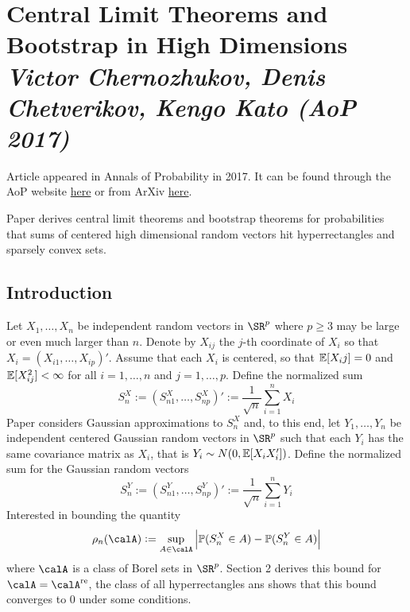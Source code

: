 
\section{Central Limit Theorems and Bootstrap in High Dimensions \textit{\small Victor Chernozhukov, Denis Chetverikov, Kengo Kato (AoP 2017)}}

Article appeared in Annals of Probability in 2017. It can be found through the AoP website \href{https://projecteuclid.org/euclid.aop/1502438428}{here} or from ArXiv \href{https://arxiv.org/pdf/1412.3661.pdf}{here}.

Paper derives central limit theorems and bootstrap theorems for probabilities that sums of centered high dimensional random vectors hit hyperrectangles and sparsely convex sets. 

\subsection{Introduction}

Let $X_1, \dots, X_n$ be independent random vectors in $\SR^p$ where $p\geq 3$ may be large or even much larger than $n$. Denote by $X_{ij}$ the $j$-th coordinate of $X_i$ so that $X_i = (X_{i1},\dots,X_{ip})'$. Assume that each $X_i$ is centered, so that $\mathbb{E}[X_ij] = 0$ and $\mathbb{E}[X_{ij}^2] < \infty$ for all $i = 1, \dots, n$ and $j = 1, \dots, p$. Define the normalized sum 
\[S_n^X := \left(S_{n1}^X, \dots, S_{np}^X\right)' := \frac{1}{\sqrt{n}} \sum_{i=1}^n X_i\]
Paper considers Gaussian approximations to $S_n^X$ and, to this end, let $Y_1, \dots, Y_n$ be independent centered Gaussian random vectors in $\SR^p$ such that each $Y_i$ has the same covariance matrix as $X_i$, that is $Y_i \sim N(0,\mathbb{E}[X_iX_i'])$. Define the normalized sum for the Gaussian random vectors 
\[S_n^Y := \left(S_{n1}^Y, \dots, S_{np}^Y\right)' := \frac{1}{\sqrt{n}}\sum_{i=1}^n Y_i\]
Interested in bounding the quantity 
\begin{equation}
	\label{eq:cck17-1}
	\rho_n(\calA) := \sup_{A\in \calA}\left| \P(S_n^X \in A) - \P(S_n^Y\in A)\right|
\end{equation}
where $\calA$ is a class of Borel sets in $\SR^p$. Section 2 derives this bound for $\calA = \calA^{\text{re}}$, the class of all hyperrectangles ans shows that this bound converges to 0 under some conditions. 

